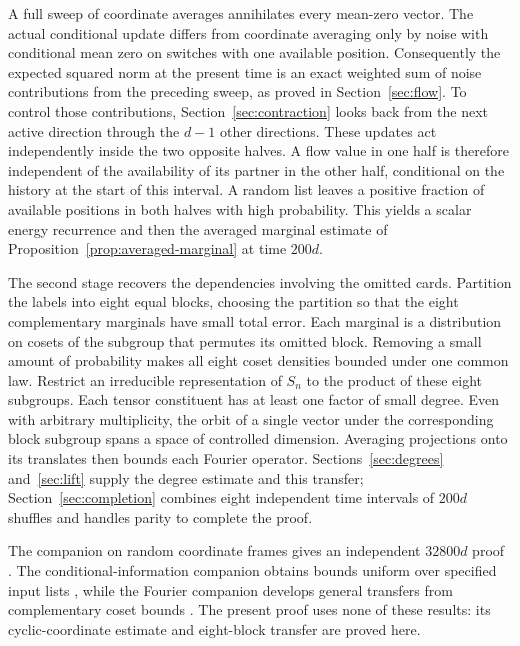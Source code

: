 \documentclass[11pt]{article}
\theoremstyle{remark}
\numberwithin{equation}{section}
\begin{document}
A full sweep of coordinate averages annihilates every mean-zero
vector. The actual conditional update differs from coordinate averaging
only by noise with conditional mean zero on switches with one available
position.
Consequently the expected squared norm at the present time is an exact
weighted sum of noise contributions from the preceding sweep, as
proved in Section~\ref{sec:flow}. To control those contributions,
Section~\ref{sec:contraction} looks back from the next active direction
through the $d-1$ other directions. These updates act independently
inside the two opposite halves. A flow value in one half is therefore
independent of the availability of its partner in the other half,
conditional on the history at the start of this interval. A random list
leaves a positive fraction of available positions in both halves with
high probability. This yields a scalar energy recurrence and then the
averaged marginal estimate of Proposition~\ref{prop:averaged-marginal}
at time $200d$.

The second stage recovers the dependencies involving the omitted
cards. Partition the labels into eight equal blocks, choosing the
partition so that the eight complementary marginals have small total
error. Each marginal is a distribution on cosets of the subgroup that
permutes its omitted block. Removing a small amount of probability
makes all eight coset densities bounded under one common law.
Restrict an irreducible representation of $S_n$ to the product of these
eight subgroups. Each tensor constituent has at least one factor of
small degree. Even with arbitrary multiplicity, the orbit of a single
vector under the corresponding block subgroup spans a space of
controlled dimension.
Averaging projections onto its translates then bounds each Fourier
operator. Sections~\ref{sec:degrees} and~\ref{sec:lift} supply the degree
estimate and this transfer; Section~\ref{sec:completion} combines eight
independent time intervals of $200d$ shuffles and handles parity to complete the proof.

The companion on random coordinate frames gives an independent
$32800d$ proof \cite[Theorem~1.1]{companion-frames}. The
conditional-information companion obtains bounds uniform over specified
input lists \cite[Theorem~1.1]{companion-conditional}, while the Fourier
companion develops general transfers from complementary coset bounds
\cite[Theorem~1.1]{companion-transfer}. The present proof uses none of
these results: its cyclic-coordinate estimate and eight-block transfer
are proved here.
\end{document}
